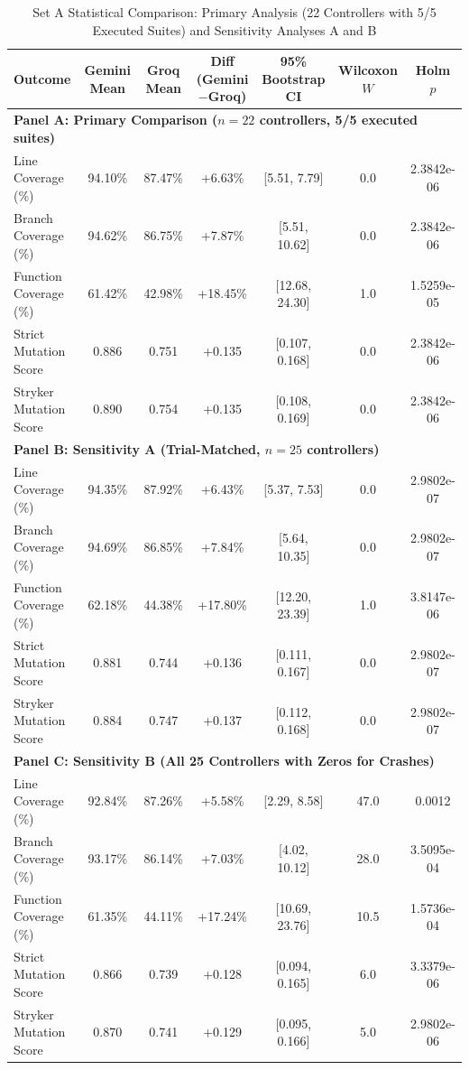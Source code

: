 \begin{table}[t]
\centering
\caption{Set A Statistical Comparison: Primary Analysis (22 Controllers with 5/5 Executed Suites) and Sensitivity Analyses A and B}
\label{tab:seta_comparison}
\begin{tabular}{lcccccc}
\toprule
\textbf{Outcome} & \textbf{Gemini Mean} & \textbf{Groq Mean} & \textbf{Diff (Gemini$-$Groq)} & \textbf{95\% Bootstrap CI} & \textbf{Wilcoxon $W$} & \textbf{Holm $p$} \\
\midrule
\multicolumn{7}{l}{\textbf{Panel A: Primary Comparison ($n=22$ controllers, 5/5 executed suites)}} \\
\midrule
Line Coverage (\%) & 94.10\% & 87.47\% & +6.63\% & [5.51, 7.79] & 0.0 & 2.3842e-06 \\
Branch Coverage (\%) & 94.62\% & 86.75\% & +7.87\% & [5.51, 10.62] & 0.0 & 2.3842e-06 \\
Function Coverage (\%) & 61.42\% & 42.98\% & +18.45\% & [12.68, 24.30] & 1.0 & 1.5259e-05 \\
Strict Mutation Score & 0.886 & 0.751 & +0.135 & [0.107, 0.168] & 0.0 & 2.3842e-06 \\
Stryker Mutation Score & 0.890 & 0.754 & +0.135 & [0.108, 0.169] & 0.0 & 2.3842e-06 \\
\midrule
\multicolumn{7}{l}{\textbf{Panel B: Sensitivity A (Trial-Matched, $n=25$ controllers)}} \\
\midrule
Line Coverage (\%) & 94.35\% & 87.92\% & +6.43\% & [5.37, 7.53] & 0.0 & 2.9802e-07 \\
Branch Coverage (\%) & 94.69\% & 86.85\% & +7.84\% & [5.64, 10.35] & 0.0 & 2.9802e-07 \\
Function Coverage (\%) & 62.18\% & 44.38\% & +17.80\% & [12.20, 23.39] & 1.0 & 3.8147e-06 \\
Strict Mutation Score & 0.881 & 0.744 & +0.136 & [0.111, 0.167] & 0.0 & 2.9802e-07 \\
Stryker Mutation Score & 0.884 & 0.747 & +0.137 & [0.112, 0.168] & 0.0 & 2.9802e-07 \\
\midrule
\multicolumn{7}{l}{\textbf{Panel C: Sensitivity B (All 25 Controllers with Zeros for Crashes)}} \\
\midrule
Line Coverage (\%) & 92.84\% & 87.26\% & +5.58\% & [2.29, 8.58] & 47.0 & 0.0012 \\
Branch Coverage (\%) & 93.17\% & 86.14\% & +7.03\% & [4.02, 10.12] & 28.0 & 3.5095e-04 \\
Function Coverage (\%) & 61.35\% & 44.11\% & +17.24\% & [10.69, 23.76] & 10.5 & 1.5736e-04 \\
Strict Mutation Score & 0.866 & 0.739 & +0.128 & [0.094, 0.165] & 6.0 & 3.3379e-06 \\
Stryker Mutation Score & 0.870 & 0.741 & +0.129 & [0.095, 0.166] & 5.0 & 2.9802e-06 \\
\bottomrule
\end{tabular}
\end{table}
